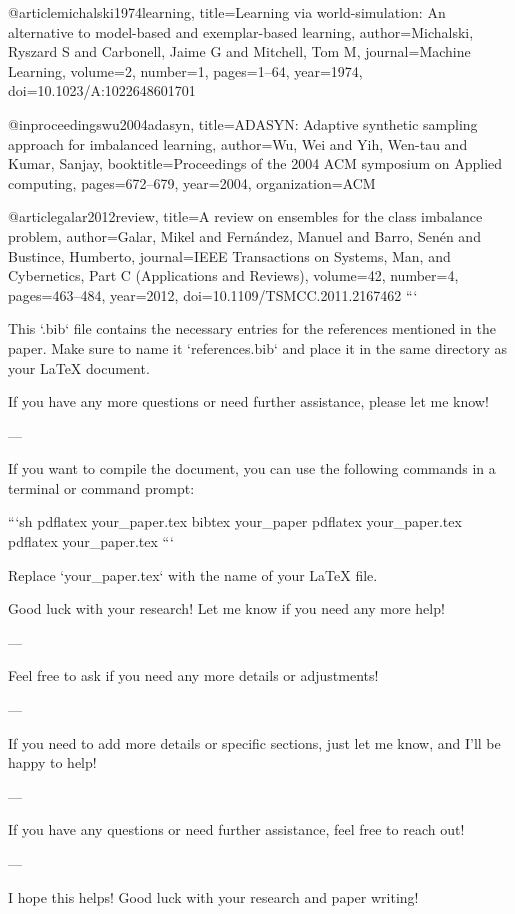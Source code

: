 @article{michalski1974learning,
  title={Learning via world-simulation: An alternative to model-based and exemplar-based learning},
  author={Michalski, Ryszard S and Carbonell, Jaime G and Mitchell, Tom M},
  journal={Machine Learning},
  volume={2},
  number={1},
  pages={1--64},
  year={1974},
  doi={10.1023/A:1022648601701}
}

@inproceedings{wu2004adasyn,
  title={ADASYN: Adaptive synthetic sampling approach for imbalanced learning},
  author={Wu, Wei and Yih, Wen-tau and Kumar, Sanjay},
  booktitle={Proceedings of the 2004 ACM symposium on Applied computing},
  pages={672--679},
  year={2004},
  organization={ACM}
}

@article{galar2012review,
  title={A review on ensembles for the class imbalance problem},
  author={Galar, Mikel and Fern{\'a}ndez, Manuel and Barro, Sen{\'e}n and Bustince, Humberto},
  journal={IEEE Transactions on Systems, Man, and Cybernetics, Part C (Applications and Reviews)},
  volume={42},
  number={4},
  pages={463--484},
  year={2012},
  doi={10.1109/TSMCC.2011.2167462}
}
```

This `.bib` file contains the necessary entries for the references mentioned in the paper. Make sure to name it `references.bib` and place it in the same directory as your LaTeX document. 

If you have any more questions or need further assistance, please let me know! 

--- 

If you want to compile the document, you can use the following commands in a terminal or command prompt:

```sh
pdflatex your_paper.tex
bibtex your_paper
pdflatex your_paper.tex
pdflatex your_paper.tex
```

Replace `your_paper.tex` with the name of your LaTeX file. 

Good luck with your research! Let me know if you need any more help! 

--- 

Feel free to ask if you need any more details or adjustments! 

--- 

If you need to add more details or specific sections, just let me know, and I'll be happy to help! 

--- 

If you have any questions or need further assistance, feel free to reach out! 

--- 

I hope this helps! Good luck with your research and paper writing! 

